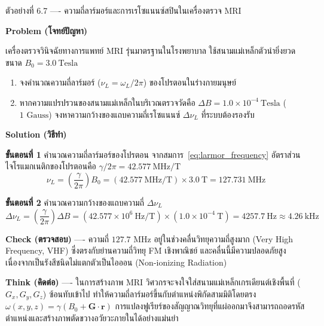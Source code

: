 \begin{psctbox}{ตัวอย่างที่ 6.7 ---- ความถี่ลาร์มอร์และการเรโซแนนซ์สปินในเครื่องตรวจ MRI}

\textbf{Problem (โจทย์ปัญหา)}

เครื่องตรวจวินิจฉัยทางการแพทย์ MRI รุ่นมาตรฐานในโรงพยาบาล ใช้สนามแม่เหล็กตัวนำยิ่งยวดขนาด $B_0 = 3.0~\text{Tesla}$
\begin{enumerate}
    \item จงคำนวณความถี่ลาร์มอร์ ($\nu_L = \omega_L/2\pi$) ของโปรตอนในร่างกายมนุษย์
    \item หากความแปรปรวนของสนามแม่เหล็กในบริเวณตรวจวัดคือ $\Delta B = 1.0 \times 10^{-4}~\text{Tesla}$ ($1\text{ Gauss}$) จงหาความกว้างของแถบความถี่เรโซแนนซ์ $\Delta \nu_L$ ที่ระบบต้องรองรับ
\end{enumerate}

\textbf{Solution (วิธีทำ)}

\textbf{ขั้นตอนที่ 1} คำนวณความถี่ลาร์มอร์ของโปรตอน
จากสมการ~\eqref{eq:larmor_frequency} อัตราส่วนไจโรแมกเนติกของโปรตอนคือ $\gamma/2\pi = 42.577~\text{MHz/T}$
\begin{equation*}
\nu_L = \left( \frac{\gamma}{2\pi} \right) B_0 = (42.577~\text{MHz/T}) \times 3.0~\text{T} = 127.731~\text{MHz}
\end{equation*}

\textbf{ขั้นตอนที่ 2} คำนวณความกว้างของแถบความถี่ $\Delta \nu_L$
\begin{equation*}
\Delta \nu_L = \left( \frac{\gamma}{2\pi} \right) \Delta B = (42.577 \times 10^6~\text{Hz/T}) \times (1.0 \times 10^{-4}~\text{T}) = 4257.7~\text{Hz} \approx 4.26~\text{kHz}
\end{equation*}

\textbf{Check (ตรวจสอบ)} ---- ความถี่ $127.7\text{ MHz}$ อยู่ในช่วงคลื่นวิทยุความถี่สูงมาก (Very High Frequency, VHF) ซึ่งตรงกับย่านความถี่วิทยุ FM เชิงพาณิชย์ และคลื่นนี้มีความปลอดภัยสูงเนื่องจากเป็นรังสีชนิดไม่แตกตัวเป็นไอออน (Non-ionizing Radiation)

\textbf{Think (คิดต่อ)} ---- ในการสร้างภาพ MRI วิศวกรจะจงใจใส่สนามแม่เหล็กเกรเดียนต์เชิงพื้นที่ ($G_x, G_y, G_z$) ซ้อนทับเข้าไป ทำให้ความถี่ลาร์มอร์ขึ้นกับตำแหน่งพิกัดสามมิติโดยตรง $\omega(x, y, z) = \gamma (B_0 + \mathbf{G}\cdot\mathbf{r})$ การแปลงฟูเรียร์ของสัญญาณวิทยุที่แผ่ออกมาจึงสามารถถอดรหัสตำแหน่งและสร้างภาพตัดขวางอวัยวะภายในได้อย่างแม่นยำ
\end{psctbox}


